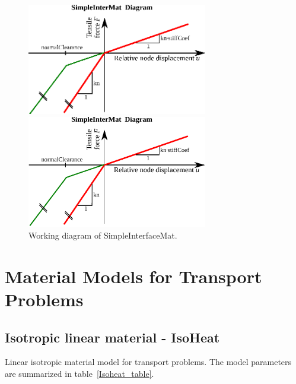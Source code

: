\documentclass[a4paper]{article}
\begin{document}
\begin{figure}[!htb]
\begin{htmlonly}
  \centerline{\includegraphics[width=0.7\textwidth]{Simple_interface_material_diag.eps}}
\end{htmlonly}
 \centerline{\includegraphics[width=0.7\textwidth]{Simple_interface_material_diag.pdf}}
  \caption{Working diagram of SimpleInterfaceMat.}
  \label{SimpleInterfaceMat}
\end{figure}




\clearpage

\section{Material Models for Transport Problems}
\subsection{Isotropic linear material - IsoHeat}
\label{IsoLET}
Linear isotropic material model for transport problems. The model parameters are summarized
in table~\ref{Isoheat_table}.
\end{document}
